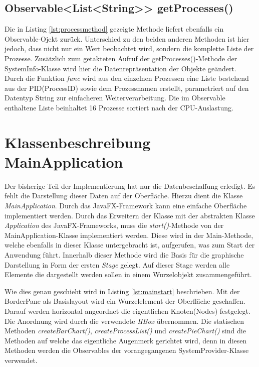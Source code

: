 \subsection{Observable<List<String>> getProcesses()}
 
Die in Listing \ref{lst:processmethod} gezeigte Methode liefert ebenfalls ein Observable-Ojekt zurück. Unterschied zu den beiden anderen Methoden ist hier jedoch, dass nicht nur ein Wert beobachtet wird, sondern die komplette Liste der Prozesse. Zusätzlich zum getakteten Aufruf der getProcesses()-Methode der SystemInfo-Klasse wird hier die Datenrepräsentation der Objekte geändert. Durch die Funktion \textit{func} wird aus den einzelnen Prozessen eine Liste bestehend aus der PID(ProcessID) sowie dem Prozessnamen erstellt, parametriert auf den Datentyp String zur einfacheren Weiterverarbeitung. Die im Observable enthaltene Liste beinhaltet 16 Prozesse sortiert nach der CPU-Auslastung.
\section{Klassenbeschreibung MainApplication}
Der bisherige Teil der Implementierung hat nur die Datenbeschaffung erledigt. Es fehlt die Darstellung dieser Daten auf der Oberfläche. Hierzu dient die Klasse \textit{MainApplication}. Durch das JavaFX-Framework kann eine einfache Oberfläche implementiert werden. Durch das Erweitern der Klasse mit der abstrakten Klasse \textit{Application} des JavaFX-Frameworks, muss die \textit{start()}-Methode von der MainApplication-Klasse implementiert werden. Diese wird in der Main-Methode, welche ebenfalls in dieser Klasse untergebracht ist, aufgerufen, was zum Start der Anwendung führt. Innerhalb dieser Methode wird die Basis für die graphische Darstellung in Form der ersten \textit{Stage} gelegt. Auf dieser Stage werden alle Elemente die dargestellt werden sollen in einem Wurzelobjekt zusammengeführt. 
 
Wie dies genau geschieht wird in Listing \ref{lst:mainstart} beschrieben. Mit der BorderPane als Basislayout wird ein Wurzelelement der Oberfläche geschaffen. Darauf werden horizontal angeordnet die eigentlichen Knoten(Nodes) festgelegt. Die Anordnung wird durch die verwendete \textit{HBox} übernommen. Die statischen Methoden \textit{createBarChart()}, \textit{createProcessList()} und \textit{createPieChart()} sind die Methoden auf welche das eigentliche Augenmerk gerichtet wird, denn in diesen Methoden werden die Observables der vorangegangenen SystemProvider-Klasse verwendet. 
